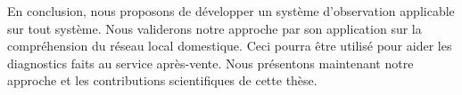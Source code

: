 En conclusion, nous proposons de développer un système d'observation applicable sur tout système. Nous validerons notre approche par son application sur la compréhension du réseau local domestique. Ceci pourra être utilisé pour aider les diagnostics faits au service après-vente. Nous présentons maintenant notre approche et les contributions scientifiques de cette thèse.